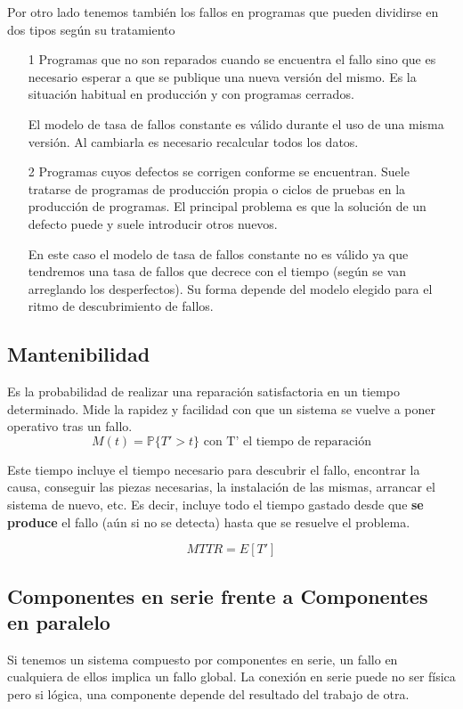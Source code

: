 Por otro lado tenemos también los fallos en programas que pueden dividirse en dos tipos según su tratamiento
\begin{enumerate}
\item[1] Programas que no son reparados cuando se encuentra el fallo sino que es necesario esperar a que se publique una nueva versión del mismo. Es la situación habitual en producción y con programas cerrados.

El modelo de tasa de fallos constante es válido durante el uso de una misma versión. Al cambiarla es necesario recalcular todos los datos.

\item[2] Programas cuyos defectos se corrigen conforme se encuentran. Suele tratarse de programas de producción propia o ciclos de pruebas en la producción de programas. El principal problema es que la solución de un defecto puede y suele introducir otros nuevos.

En este caso el modelo de tasa de fallos constante no es válido ya que tendremos una tasa de fallos que decrece con el tiempo (según se van arreglando los desperfectos). Su forma depende del modelo elegido para el ritmo de descubrimiento de fallos.

\end{enumerate}

\subsection{Mantenibilidad}
Es la probabilidad de realizar una reparación satisfactoria en un tiempo determinado. Mide la rapidez y facilidad con que un sistema se vuelve a poner operativo tras un fallo.
\[M(t)=\mathbb{P}\{T'> t\} \text{ con T' el tiempo de reparación}\]

Este tiempo incluye el tiempo necesario para descubrir el fallo, encontrar la causa, conseguir las piezas necesarias, la instalación de las mismas, arrancar el sistema de nuevo, etc. Es decir, incluye todo el tiempo gastado desde que \textbf{se produce} el fallo (aún si no se detecta) hasta que se resuelve el problema.

\[MTTR=E[T']\]

\subsection{Componentes en serie frente a Componentes en paralelo}

Si tenemos un sistema compuesto por componentes en serie, un fallo en cualquiera de ellos implica un fallo global. La conexión en serie puede no ser física pero si lógica, una componente depende del resultado del trabajo de otra.

